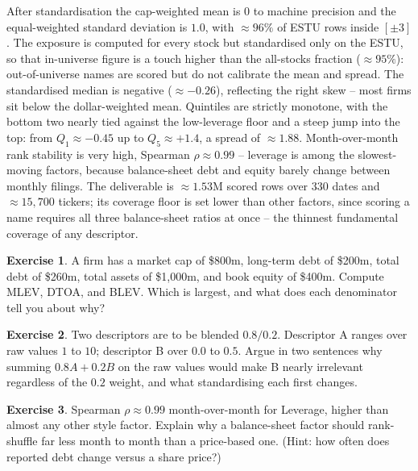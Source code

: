 \documentclass[11pt]{article}
\theoremstyle{definition}
\newtheorem{exercise}{Exercise}[section]
\theoremstyle{plain}
\theoremstyle{remark}
\begin{document}
\begin{observed}
After standardisation the cap-weighted mean is $0$ to machine precision and the equal-weighted standard deviation is $1.0$, with $\approx 96\%$ of ESTU rows inside $[\pm 3]$. The exposure is computed for every stock but standardised only on the ESTU, so that in-universe figure is a touch higher than the all-stocks fraction ($\approx 95\%$): out-of-universe names are scored but do not calibrate the mean and spread. The standardised median is negative ($\approx -0.26$), reflecting the right skew -- most firms sit below the dollar-weighted mean. Quintiles are strictly monotone, with the bottom two nearly tied against the low-leverage floor and a steep jump into the top: from $Q_1 \approx -0.45$ up to $Q_5 \approx +1.4$, a spread of $\approx 1.88$. Month-over-month rank stability is very high, Spearman $\rho \approx 0.99$ -- leverage is among the slowest-moving factors, because balance-sheet debt and equity barely change between monthly filings. The deliverable is $\approx 1.53$M scored rows over $330$ dates and $\approx 15{,}700$ tickers; its coverage floor is set lower than other factors, since scoring a name requires all three balance-sheet ratios at once -- the thinnest fundamental coverage of any descriptor.
\end{observed}

\begin{exercise}
A firm has a market cap of \$800m, long-term debt of \$200m, total debt of \$260m, total assets of \$1,000m, and book equity of \$400m. Compute MLEV, DTOA, and BLEV. Which is largest, and what does each denominator tell you about why?
\end{exercise}

\begin{exercise}
Two descriptors are to be blended $0.8/0.2$. Descriptor A ranges over raw values $1$ to $10$; descriptor B over $0.0$ to $0.5$. Argue in two sentences why summing $0.8A + 0.2B$ on the raw values would make B nearly irrelevant regardless of the $0.2$ weight, and what standardising each first changes.
\end{exercise}

\begin{exercise}
Spearman $\rho \approx 0.99$ month-over-month for Leverage, higher than almost any other style factor. Explain why a balance-sheet factor should rank-shuffle far less month to month than a price-based one. (Hint: how often does reported debt change versus a share price?)
\end{exercise}
\end{document}
